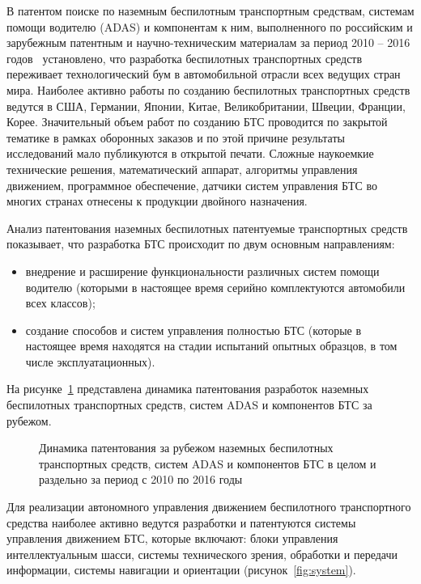 В патентом поиске по наземным беспилотным транспортным средствам, системам помощи водителю (ADAS) и компонентам к ним, выполненного по российским и зарубежным патентным и научно-техническим материалам за период 2010 – 2016 годов~\cite{Saikin} установлено, что разработка беспилотных транспортных средств переживает технологический бум в автомобильной отрасли всех ведущих стран мира. Наиболее активно работы по созданию беспилотных транспортных средств ведутся в США, Германии, Японии, Китае, Великобритании, Швеции, Франции, Корее. Значительный объем работ по созданию БТС проводится по закрытой тематике в рамках оборонных заказов и по этой причине результаты исследований мало публикуются в открытой печати. Сложные наукоемкие технические решения, математический аппарат, алгоритмы управления движением, программное обеспечение, датчики систем управления БТС во многих странах отнесены к продукции двойного назначения.

Анализ патентования наземных беспилотных патентуемые транспортных средств показывает, что разработка БТС происходит по двум основным направлениям:

\begin{itemize}
    \item внедрение и расширение функциональности различных систем помощи водителю (которыми в настоящее время серийно комплектуются автомобили всех классов);
    \item создание способов и систем управления полностью БТС (которые в настоящее время находятся на стадии испытаний опытных образцов, в том числе эксплуатационных).
\end{itemize}

На рисунке~\cref{fig:patent} представлена динамика патентования разработок наземных беспилотных транспортных средств, систем ADAS и компонентов БТС за рубежом.

\begin{figure}[ht]
    \caption{Динамика патентования за рубежом наземных беспилотных транспортных средств, систем ADAS и компонентов БТС в целом и раздельно за период с 2010 по 2016 годы}\label{fig:patent}
\end{figure}

Для реализации автономного управления движением беспилотного транспортного средства наиболее активно ведутся разработки и патентуются системы управления движением БТС, которые включают: блоки управления интеллектуальным шасси, системы технического зрения, обработки и передачи информации, системы навигации и ориентации (рисунок~\cref{fig:system}). 

